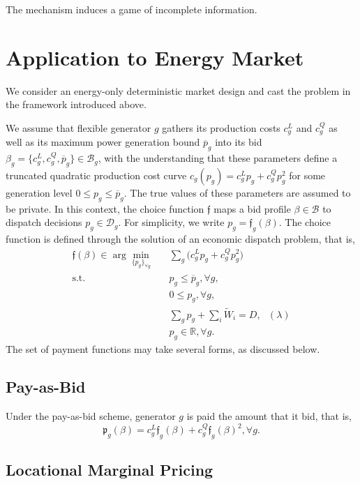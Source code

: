 \documentclass{article}
\begin{document}
The mechanism induces a game of incomplete information.

\section{Application to Energy Market}

We consider an energy-only deterministic market design and cast the problem in the framework introduced above.

We assume that flexible generator $g$ gathers its production costs $c_g^L$ and $c_g^Q$ as well as its maximum power generation bound $\overline{p}_g$ into its bid $\beta_g = \{c_g^L, c_g^Q, \overline{p}_g\} \in \mathcal{B}_g$, with the understanding that these parameters define a truncated quadratic production cost curve $c_g(p_g) = c_g^L p_g + c_g^Q p_g^2$ for some generation level $0 \le p_g \le \overline{p}_g$. The true values of these parameters are assumed to be private. In this context, the choice function $\mathfrak{f}$ maps a bid profile $\beta \in \mathcal{B}$ to dispatch decisions $p_g \in \mathcal{D}_g$. For simplicity, we write $p_g = \mathfrak{f}_g(\beta)$. The choice function is defined through the solution of an economic dispatch problem, that is,
\begin{align}
\mathfrak{f}(\beta) \in \arg \underset{\{p_g\}_{\forall g}}{\min} \hspace{10pt} & \sum_g \Big(c_g^Lp_g + c_g^Q p_g^2 \Big)\\
\mbox{s.t. } & p_g \le \overline{p}_g,\forall g,\\
& 0 \le p_g,\forall g,\\
& \sum_g p_g + \sum_i \tilde{W}_i = D, \mbox{ } (\lambda)\\
& p_g \in \mathbb{R}, \forall g.
\end{align}
The set of payment functions may take several forms, as discussed below.

\subsection{Pay-as-Bid}

Under the pay-as-bid scheme, generator $g$ is paid the amount that it bid, that is,
\begin{equation*}
\mathfrak{p}_g(\beta) = c_g^L \mathfrak{f}_g(\beta) + c_g^Q \mathfrak{f}_g(\beta)^2, \forall g.
\end{equation*}

\subsection{Locational Marginal Pricing}
\end{document}
